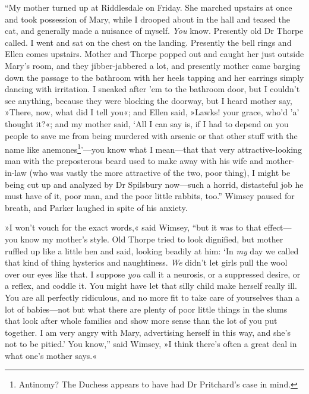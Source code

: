 \enquote{My mother turned up at Riddlesdale on Friday. She marched upstairs at once and took possession of Mary, while I drooped about in the hall and teased the cat, and generally made a nuisance of myself. \textit{You} know. Presently old Dr Thorpe called. I went and sat on the chest on the landing. Presently the bell rings and Ellen comes upstairs. Mother and Thorpe popped out and caught her just outside Mary's room, and they jibber-jabbered a lot, and presently mother came barging down the passage to the bathroom with her heels tapping and her earrings simply dancing with irritation. I sneaked after 'em to the bathroom door, but I couldn't see anything, because they were blocking the doorway, but I heard mother say, »There, now, what did I tell you«; and Ellen said, »Lawks! your grace, who'd 'a' thought it?«; and my mother said, \enquote{All I can say is, if I had to depend on you people to save me from being murdered with arsenic or that other stuff with the name like anemones\footnote{Antinomy? The Duchess appears to have had Dr Pritchard's case in mind.}}---you know what I mean\allowbreak---\allowbreak that that very attractive-looking man with the preposterous beard used to make away with his wife and mother-in-law (who was vastly the more attractive of the two, poor thing), I might be being cut up and analyzed by Dr Spilsbury now\allowbreak---\allowbreak such a horrid, distasteful job he must have of it, poor man, and the poor little rabbits, too.} Wimsey paused for breath, and Parker laughed in spite of his anxiety.

»I won't vouch for the exact words,« said Wimsey, \enquote{but it was to that effect\allowbreak---\allowbreak you know my mother's style. Old Thorpe tried to look dignified, but mother ruffled up like a little hen and said, looking beadily at him: \enquote{In \textit{my} day we called that kind of thing hysterics and naughtiness. \textit{We} didn't let girls pull the wool over our eyes like that. I suppose \textit{you} call it a neurosis, or a suppressed desire, or a reflex, and coddle it. You might have let that silly child make herself really ill. You are all perfectly ridiculous, and no more fit to take care of yourselves than a lot of babies\allowbreak---\allowbreak not but what there are plenty of poor little things in the slums that look after whole families and show more sense than the lot of you put together. I am very angry with Mary, advertising herself in this way, and she's not to be pitied.} You know,} said Wimsey, »I think there's often a great deal in what one's mother says.«

